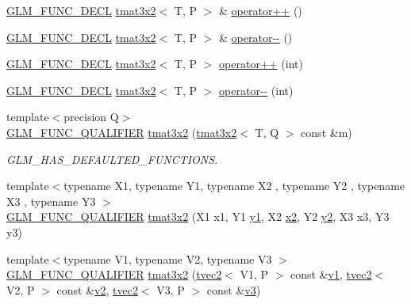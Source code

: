 \begin{DoxyCompactItemize}
\item 
\mbox{\hyperlink{setup_8hpp_ab2d052de21a70539923e9bcbf6e83a51}{G\+L\+M\+\_\+\+F\+U\+N\+C\+\_\+\+D\+E\+CL}} \mbox{\hyperlink{structglm_1_1tmat3x2}{tmat3x2}}$<$ T, P $>$ \& \mbox{\hyperlink{structglm_1_1tmat3x2_a8ef0fdf574941e87f0e7da6b36304f97}{operator++}} ()
\item 
\mbox{\hyperlink{setup_8hpp_ab2d052de21a70539923e9bcbf6e83a51}{G\+L\+M\+\_\+\+F\+U\+N\+C\+\_\+\+D\+E\+CL}} \mbox{\hyperlink{structglm_1_1tmat3x2}{tmat3x2}}$<$ T, P $>$ \& \mbox{\hyperlink{structglm_1_1tmat3x2_a655f4f20c013de86c872da9a60183b05}{operator-\/-\/}} ()
\item 
\mbox{\hyperlink{setup_8hpp_ab2d052de21a70539923e9bcbf6e83a51}{G\+L\+M\+\_\+\+F\+U\+N\+C\+\_\+\+D\+E\+CL}} \mbox{\hyperlink{structglm_1_1tmat3x2}{tmat3x2}}$<$ T, P $>$ \mbox{\hyperlink{structglm_1_1tmat3x2_a70f90e05d9c13d7145369d4e3ebf7184}{operator++}} (int)
\item 
\mbox{\hyperlink{setup_8hpp_ab2d052de21a70539923e9bcbf6e83a51}{G\+L\+M\+\_\+\+F\+U\+N\+C\+\_\+\+D\+E\+CL}} \mbox{\hyperlink{structglm_1_1tmat3x2}{tmat3x2}}$<$ T, P $>$ \mbox{\hyperlink{structglm_1_1tmat3x2_a79b323eca5c708e456e2675586895444}{operator-\/-\/}} (int)
\item 
{\footnotesize template$<$precision Q$>$ }\\\mbox{\hyperlink{setup_8hpp_a33fdea6f91c5f834105f7415e2a64407}{G\+L\+M\+\_\+\+F\+U\+N\+C\+\_\+\+Q\+U\+A\+L\+I\+F\+I\+ER}} \mbox{\hyperlink{structglm_1_1tmat3x2_a5c9661d554c44cfa3db4ca95c5fd553a}{tmat3x2}} (\mbox{\hyperlink{structglm_1_1tmat3x2}{tmat3x2}}$<$ T, Q $>$ const \&m)
\begin{DoxyCompactList}\small\item\em G\+L\+M\+\_\+\+H\+A\+S\+\_\+\+D\+E\+F\+A\+U\+L\+T\+E\+D\+\_\+\+F\+U\+N\+C\+T\+I\+O\+NS. \end{DoxyCompactList}\item 
{\footnotesize template$<$typename X1, typename Y1, typename X2 , typename Y2 , typename X3 , typename Y3 $>$ }\\\mbox{\hyperlink{setup_8hpp_a33fdea6f91c5f834105f7415e2a64407}{G\+L\+M\+\_\+\+F\+U\+N\+C\+\_\+\+Q\+U\+A\+L\+I\+F\+I\+ER}} \mbox{\hyperlink{structglm_1_1tmat3x2_a52d0621ae05376523e889c01e6ad3e08}{tmat3x2}} (X1 x1, Y1 \mbox{\hyperlink{glad_8h_a48340161068d267815ac3131e9d03def}{y1}}, X2 \mbox{\hyperlink{glad_8h_ad2cea6eadb01f017f0d57e7edf0ce988}{x2}}, Y2 \mbox{\hyperlink{glad_8h_af7158b5d27f7a6aa4ab9973fcc3a5c20}{y2}}, X3 x3, Y3 y3)
\item 
{\footnotesize template$<$typename V1, typename V2, typename V3 $>$ }\\\mbox{\hyperlink{setup_8hpp_a33fdea6f91c5f834105f7415e2a64407}{G\+L\+M\+\_\+\+F\+U\+N\+C\+\_\+\+Q\+U\+A\+L\+I\+F\+I\+ER}} \mbox{\hyperlink{structglm_1_1tmat3x2_a1d369b5df9f52f6561912a6d8d4d581b}{tmat3x2}} (\mbox{\hyperlink{structglm_1_1tvec2}{tvec2}}$<$ V1, P $>$ const \&\mbox{\hyperlink{glad_8h_a0779c3b73f9aa3a0ac5b0139b5d291d9}{v1}}, \mbox{\hyperlink{structglm_1_1tvec2}{tvec2}}$<$ V2, P $>$ const \&\mbox{\hyperlink{glad_8h_a9a09a1837922b2b806f4589096a52049}{v2}}, \mbox{\hyperlink{structglm_1_1tvec2}{tvec2}}$<$ V3, P $>$ const \&\mbox{\hyperlink{glad_8h_acc806b31cbf466ceba6555983d8b814d}{v3}})

\end{DoxyCompactItemize}
